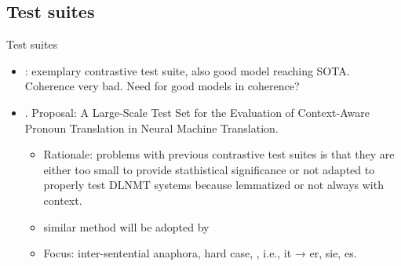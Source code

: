 \subsection{Test suites}
\begin{frame}{Test suites}
	
	\begin{itemize}
		\item \cite{bawden_evaluating_2018}: exemplary contrastive test suite, also good model reaching SOTA. Coherence very bad. Need for good models in coherence?
		\item \cite{muller_large-scale_2018}.  Proposal: A Large-Scale Test Set for the Evaluation of Context-Aware Pronoun Translation in Neural Machine Translation.
		\begin{itemize}
			\item Rationale: problems with previous contrastive test suites is that they are either too small to provide stathistical significance \cite{bawden_evaluating_2018} or not adapted to properly test DLNMT systems because lemmatized or not always with context.
			\item similar method will be adopted by \cite{jwalapuram_evaluating_2019}
			\item Focus: inter-sentential anaphora, hard case, , i.e., it → er, sie, es.
		\end{itemize}
	\end{itemize}
	
\end{frame}

